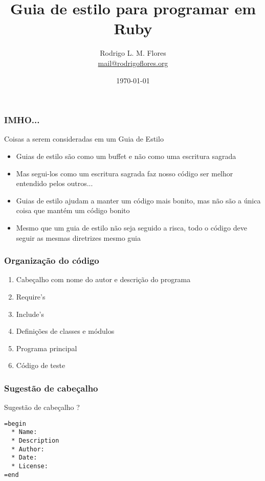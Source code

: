 \documentclass{beamer}
\title{Guia de estilo para programar em Ruby}
\author{Rodrigo L. M. Flores \\ \url{mail@rodrigoflores.org}}
\institute{Projeto Archlinux-BR}
\begin{document}
\date{\today}

\frame{\titlepage}

\begin{frame}
    \frametitle{IMHO...}
    \begin{block}{Coisas a serem consideradas em um Guia de Estilo}
        \begin{itemize}
            \item Guias de estilo são como um buffet e não como uma escritura sagrada
            \item Mas segui-los como um escritura sagrada faz nosso código ser melhor entendido pelos outros...
            \item Guias de estilo ajudam a manter um código mais bonito, mas não são a única coisa que mantém um código bonito
            \item Mesmo que um guia de estilo não seja seguido a risca, todo o código deve seguir as mesmas diretrizes mesmo guia
        \end{itemize}
    \end{block}
\end{frame}

\begin{frame}
    \frametitle{Organização do código}
    \begin{enumerate}
        \item Cabeçalho com nome do autor e descrição do programa
        \item Require's
        \item Include's
        \item Definições de classes e módulos
        \item Programa principal
        \item Código de teste
    \end{enumerate}
\end{frame}


\begin{frame}[fragile]
    \frametitle{Sugestão de cabeçalho}
    \begin{block}{Sugestão de cabeçalho ?}
        \begin{verbatim}
=begin
  * Name:
  * Description   
  * Author:
  * Date:
  * License:
=end
        \end{verbatim}


    \end{block}
\end{frame}
\end{document}
